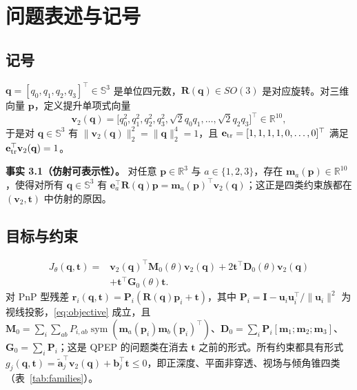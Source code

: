 \section{问题表述与记号}\label{sec:formulation}

\subsection{记号}\label{sec:notation}
$\mathbf q=[q_0,q_1,q_2,q_3]^\top\in\mathbb{S}^3$ 是单位四元数，$\mathbf R(\mathbf q)\in SO(3)$ 是对应旋转。对三维向量 $\mathbf p$，定义提升单项式向量
\begin{equation}
\mathbf v_2(\mathbf q)=\big[q_0^2,q_1^2,q_2^2,q_3^2,\sqrt2 q_0q_1,\dots,\sqrt2 q_2q_3\big]^\top\in\mathbb{R}^{10},
\label{eq:v2}
\end{equation}
于是对 $\mathbf q\in\mathbb{S}^3$ 有 $\|\mathbf v_2(\mathbf q)\|_2^2=\|\mathbf q\|_2^4=1$，且 $\mathbf e_{\rm tr}=[1,1,1,1,0,\dots,0]^\top$ 满足 $\mathbf e_{\rm tr}^\top\mathbf v_2(\mathbf q)=1$。

\textbf{事实 3.1（仿射可表示性）。} 对任意 $\mathbf p\in\mathbb{R}^3$ 与 $a\in\{1,2,3\}$，存在 $\mathbf m_a(\mathbf p)\in\mathbb{R}^{10}$，使得对所有 $\mathbf q\in\mathbb{S}^3$ 有 $\mathbf e_a^\top\mathbf R(\mathbf q)\mathbf p=\mathbf m_a(\mathbf p)^\top\mathbf v_2(\mathbf q)$；这正是四类约束族都在 $(\mathbf v_2,\mathbf t)$ 中仿射的原因。

\subsection{目标与约束}\label{sec:objective}
\begin{equation}
\begin{aligned}
J_\theta(\mathbf q,\mathbf t)={}&\mathbf v_2(\mathbf q)^\top\mathbf M_0(\theta)\mathbf v_2(\mathbf q)+2\mathbf t^\top\mathbf D_0(\theta)\mathbf v_2(\mathbf q)\\
&+\mathbf t^\top\mathbf G_0(\theta)\mathbf t .
\end{aligned}
\label{eq:objective}
\end{equation}
对 PnP 型残差 $\mathbf r_i(\mathbf q,\mathbf t)=\mathbf P_i(\mathbf R(\mathbf q)\mathbf p_i+\mathbf t)$，其中 $\mathbf P_i=\mathbf I-\mathbf u_i\mathbf u_i^\top/\|\mathbf u_i\|^2$ 为视线投影，\eqref{eq:objective} 成立，且 $\mathbf M_0=\sum_i\sum_{ab}P_{i,ab}\operatorname{sym}(\mathbf m_a(\mathbf p_i)\mathbf m_b(\mathbf p_i)^\top)$、$\mathbf D_0=\sum_i\mathbf P_i[\mathbf m_1;\mathbf m_2;\mathbf m_3]$、$\mathbf G_0=\sum_i\mathbf P_i$；这是 QPEP 的问题类在消去 $\mathbf t$ 之前的形式。所有约束都具有形式 $g_j(\mathbf q,\mathbf t)=\tilde{\mathbf a}_j^\top\mathbf v_2(\mathbf q)+\mathbf b_j^\top\mathbf t\le0$，即正深度、平面非穿透、视场与倾角锥四类（表~\ref{tab:families}）。

